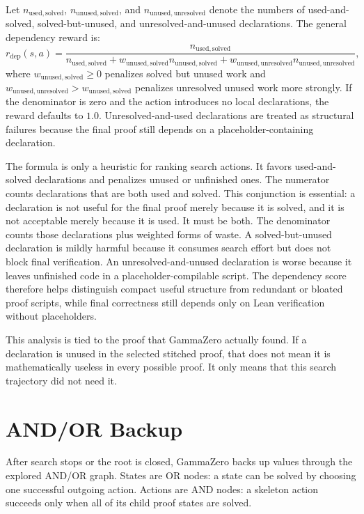 Let \(n_{\mathrm{used,solved}}\), \(n_{\mathrm{unused,solved}}\), and
\(n_{\mathrm{unused,unresolved}}\) denote the numbers of used-and-solved, solved-but-unused, and
unresolved-and-unused declarations. The general dependency
reward is:
\[
r_{\mathrm{dep}}(s,a) =
\frac{n_{\mathrm{used,solved}}}
{n_{\mathrm{used,solved}}
 + w_{\mathrm{unused,solved}} n_{\mathrm{unused,solved}}
 + w_{\mathrm{unused,unresolved}} n_{\mathrm{unused,unresolved}}},
\]
where \(w_{\mathrm{unused,solved}} \ge 0\) penalizes solved but unused work and
\(w_{\mathrm{unused,unresolved}} > w_{\mathrm{unused,solved}}\) penalizes unresolved unused work more
strongly. If the denominator is zero and the action introduces no local declarations, the reward defaults
to \(1.0\). Unresolved-and-used declarations are treated as
structural failures because the final proof still depends on a placeholder-containing declaration.

The formula is only a heuristic for ranking search actions. It favors used-and-solved declarations and penalizes unused or unfinished ones.
The numerator counts declarations that are both used and solved. This conjunction is essential: a declaration is not useful for
the final proof merely because it is solved, and it is not acceptable merely because it is used. It must be
both. The denominator counts those declarations plus weighted
forms of waste. A solved-but-unused declaration is mildly harmful because it consumes search effort but
does not block final verification. An unresolved-and-unused declaration is worse because it leaves
unfinished code in a placeholder-compilable script. The dependency score therefore helps distinguish
compact useful structure from redundant or bloated proof scripts, while final correctness still depends
only on Lean verification without placeholders.

This analysis is tied to the proof that GammaZero actually found. If a declaration is unused in the
selected stitched proof, that does not mean it is mathematically useless in every possible proof. It only
means that this search trajectory did not need it.

\section{AND/OR Backup}
\label{subsec:and-or-backup}

After search stops or the root is closed, GammaZero backs up values through the explored AND/OR graph.
States are OR nodes: a state can be solved by choosing one successful outgoing action. Actions are AND
nodes: a skeleton action succeeds only when all of its child proof states are solved.

